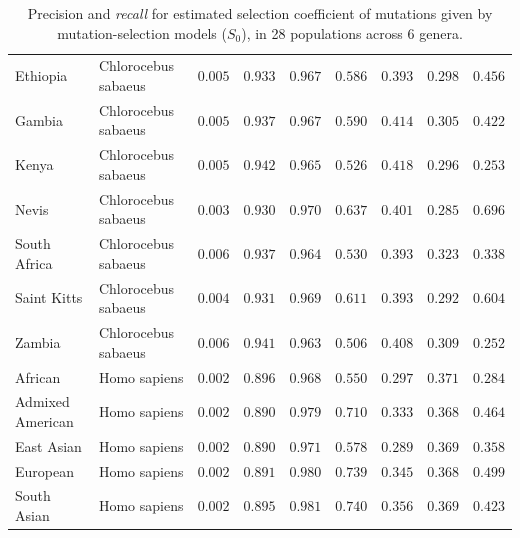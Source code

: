 \documentclass{article}
\newcommand{\Sphy}{S_{0}}
\begin{document}
\begin{table}[tb]
\begin{adjustbox}{width=\textwidth}
\begin{tabular}{||l|l|r||r|r||r|r||r|r||}
                \rowcolor{LIGHTGREY} Ethiopia          & Chlorocebus sabaeus & $ 0.005$ & $ 0.933$ & $ 0.967$ & $ 0.586$ & $ 0.393$ & $ 0.298$ & $ 0.456$ \\
                \rowcolor{LIGHTGREY} Gambia               & Chlorocebus sabaeus & $ 0.005$ & $ 0.937$ & $ 0.967$ & $ 0.590$ & $ 0.414$ & $ 0.305$ & $ 0.422$ \\
                \rowcolor{LIGHTGREY} Kenya              & Chlorocebus sabaeus        & $ 0.005$ & $ 0.942$ & $ 0.965$ & $ 0.526$ & $ 0.418$ & $ 0.296$ & $ 0.253$ \\
                \rowcolor{LIGHTGREY} Nevis     & Chlorocebus sabaeus        & $ 0.003$ & $ 0.930$ & $ 0.970$ & $ 0.637$ & $ 0.401$ & $ 0.285$ & $ 0.696$ \\
                \rowcolor{LIGHTGREY} South Africa           & Chlorocebus sabaeus        & $ 0.006$ & $ 0.937$ & $ 0.964$ & $ 0.530$ & $ 0.393$ & $ 0.323$ & $ 0.338$ \\
                \rowcolor{LIGHTGREY} Saint Kitts             & Chlorocebus sabaeus        & $ 0.004$ & $ 0.931$ & $ 0.969$ & $ 0.611$ & $ 0.393$ & $ 0.292$ & $ 0.604$ \\
                \rowcolor{LIGHTGREY} Zambia          & Chlorocebus sabaeus        & $ 0.006$ & $ 0.941$ & $ 0.963$ & $ 0.506$ & $ 0.408$ & $ 0.309$ & $ 0.252$ \\
                African          & Homo sapiens        & $ 0.002$ & $ 0.896$ & $ 0.968$ & $ 0.550$ & $ 0.297$ & $ 0.371$ & $ 0.284$ \\
                Admixed American          & Homo sapiens        & $ 0.002$ & $ 0.890$ & $ 0.979$ & $ 0.710$ & $ 0.333$ & $ 0.368$ & $ 0.464$ \\
                East Asian          & Homo sapiens        & $ 0.002$ & $ 0.890$ & $ 0.971$ & $ 0.578$ & $ 0.289$ & $ 0.369$ & $ 0.358$ \\
                European          & Homo sapiens        & $ 0.002$ & $ 0.891$ & $ 0.980$ & $ 0.739$ & $ 0.345$ & $ 0.368$ & $ 0.499$ \\
                South Asian          & Homo sapiens        & $ 0.002$ & $ 0.895$ & $ 0.981$ & $ 0.740$ & $ 0.356$ & $ 0.369$ & $ 0.423$ \\
                \bottomrule
            \end{tabular}
        \end{adjustbox}
        \caption{
            Precision and \textit{recall} for estimated selection coefficient of mutations given by mutation-selection models ($\Sphy$), in 28 populations across 6 genera.
}
\end{table}
\end{document}
